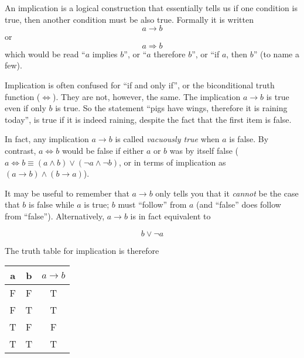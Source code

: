 \documentclass{article}
\begin{document}
An implication is a logical construction that essentially tells us if one condition is true, then another condition must be also true.  Formally it is written $$ a \rightarrow b $$ or $$a \Rightarrow b$$ which would be read ``$a$ implies $b$'', or ``$a$ therefore $b$'', or ``if $a$, then $b$'' (to name a few).

Implication is often confused for ``if and only if'', or the biconditional truth function ($\Leftrightarrow$).  They are not, however, the same.  The implication $a \rightarrow b$ is true even if only $b$ is true.  So the statement ``pigs have wings, therefore it is raining today'', is true if it is indeed raining, despite the fact that the first item is false.

In fact, any implication $a \rightarrow b$ is called \emph{vacuously true} when $a$ is false.  By contrast, $a \Leftrightarrow b$ would be false if either $a$ or $b$ was by itself false ($a \Leftrightarrow b \equiv (a \land b) \lor (\lnot a \land \lnot b)$, or in terms of implication as $(a \rightarrow b) \land (b \rightarrow a)$).

It may be useful to remember that $a \rightarrow b$ only tells you that it \emph{cannot} be the case that $b$ is false while $a$ is true; $b$ must ``follow'' from $a$ (and ``false'' does follow from ``false'').  Alternatively, $a \rightarrow b$ is in fact equivalent to 

$$ b \lor \lnot a $$

The truth table for implication is therefore

\begin{center}
\begin{tabular}{ccc}
a & b & $a \rightarrow b$ \\
\hline
F & F & T \\
F & T & T \\
T & F & F \\
T & T & T \\
\end{tabular}
\end{center}
\end{document}

